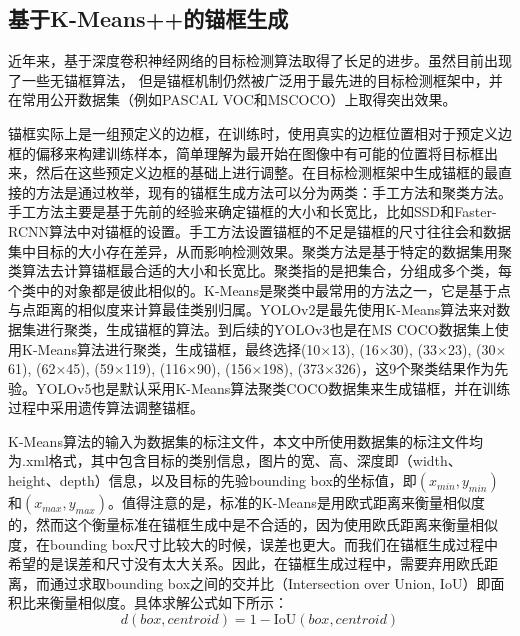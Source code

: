 \subsection{基于K-Means++的锚框生成}
近年来，基于深度卷积神经网络的目标检测算法取得了长足的进步。虽然目前出现了一些无锚框算法， 但是锚框机制仍然被广泛用于最先进的目标检测框架中，并在常用公开数据集（例如PASCAL VOC和MSCOCO）上取得突出效果。

锚框实际上是一组预定义的边框，在训练时，使用真实的边框位置相对于预定义边框的偏移来构建训练样本，简单理解为最开始在图像中有可能的位置将目标框出来，然后在这些预定义边框的基础上进行调整。在目标检测框架中生成锚框的最直接的方法是通过枚举，现有的锚框生成方法可以分为两类：手工方法和聚类方法。手工方法主要是基于先前的经验来确定锚框的大小和长宽比，比如SSD和Faster-RCNN算法中对锚框的设置。手工方法设置锚框的不足是锚框的尺寸往往会和数据集中目标的大小存在差异，从而影响检测效果。聚类方法是基于特定的数据集用聚类算法去计算锚框最合适的大小和长宽比。聚类指的是把集合，分组成多个类，每个类中的对象都是彼此相似的。K-Means是聚类中最常用的方法之一，它是基于点与点距离的相似度来计算最佳类别归属。YOLOv2是最先使用K-Means算法来对数据集进行聚类，生成锚框的算法。到后续的YOLOv3也是在MS COCO数据集上使用K-Means算法进行聚类，生成锚框，最终选择(10$\times$13), (16$\times$30), (33$\times$23), (30$\times$61), (62$\times$45), (59$\times$119), (116$\times$90), (156$\times$198), (373$\times$326)，这9个聚类结果作为先验。YOLOv5也是默认采用K-Means算法聚类COCO数据集来生成锚框，并在训练过程中采用遗传算法调整锚框。

K-Means算法的输入为数据集的标注文件，本文中所使用数据集的标注文件均为.xml格式，其中包含目标的类别信息，图片的宽、高、深度即（width、height、depth）信息，以及目标的先验bounding box的坐标值，即$(x_{min},y_{min})$和$(x_{max},y_{max})$。值得注意的是，标准的K-Means是用欧式距离来衡量相似度的，然而这个衡量标准在锚框生成中是不合适的，因为使用欧氏距离来衡量相似度，在bounding box尺寸比较大的时候，误差也更大。而我们在锚框生成过程中希望的是误差和尺寸没有太大关系。因此，在锚框生成过程中，需要弃用欧氏距离，而通过求取bounding box之间的交并比（Intersection over Union, IoU）即面积比来衡量相似度。具体求解公式如下所示：
\begin{equation}
	d(box,centroid)=1-\mathrm{IoU}(box, centroid)
	\label{Iou}
\end{equation} 

